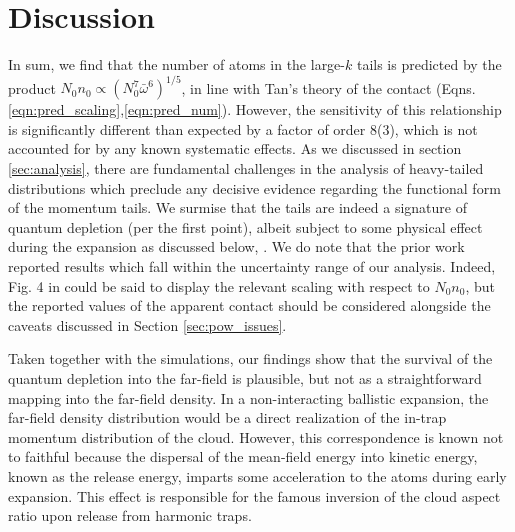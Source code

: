 

\section{Discussion}
\label{sec:discussion}

	

	In sum, we find that the number of atoms in the large-$k$ tails is predicted by the product $N_0n_0\propto(N_{0}^7\bar{\omega}^6)^{1/5}$, in line with Tan's theory of the contact (Eqns. \ref{eqn:pred_scaling},\ref{eqn:pred_num}). 
	However, the sensitivity of this relationship is significantly different than expected by a factor of order 8(3), which is not accounted for by any known systematic effects.
	As we discussed in section \ref{sec:analysis}, there are fundamental challenges in the analysis of heavy-tailed distributions which preclude any decisive evidence regarding the functional form of the momentum tails.
	We surmise that the tails are indeed a signature of quantum depletion (per the first point), albeit subject to some physical effect during the expansion as discussed below, .
	We do note that the prior work \cite{Chang16} reported results which fall within the uncertainty range of our analysis.
	Indeed, Fig. 4 in \cite{Chang16} could be said to display the relevant scaling with respect to $N_0n_0$, but the reported values of the apparent contact should be considered alongside the caveats discussed in Section \ref{sec:pow_issues}.
	
	Taken together with the simulations, our findings show that the survival of the quantum depletion into the far-field is plausible, but not as a straightforward mapping into the far-field density.
	In a non-interacting ballistic expansion, the far-field density distribution would be a direct realization of the in-trap momentum distribution of the cloud. 
	However, this correspondence is known not to faithful because the dispersal of the mean-field energy into kinetic energy, known as the release energy, imparts some acceleration to the atoms during early expansion. 
	This effect is responsible for the famous inversion of the cloud aspect ratio upon release from harmonic traps. 

